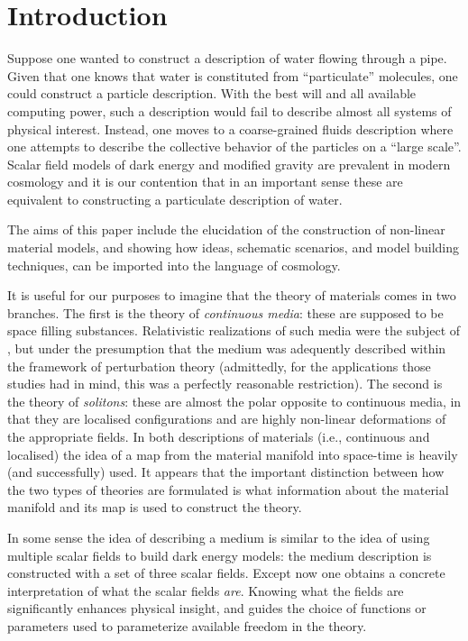 
\section{Introduction}

Suppose one wanted to construct a description of water flowing through a pipe. Given that one knows that water is constituted from ``particulate'' molecules,  one could construct a particle description. With the best will and all available computing power, such a description would fail to describe almost all systems of physical interest. Instead, one moves to a coarse-grained fluids description where one attempts to describe the collective behavior of the particles on a ``large scale''.  Scalar field models of dark energy and modified gravity are prevalent in modern cosmology and it is our contention that in an important sense these are equivalent to constructing a particulate description of water.

The aims of this paper include the elucidation of the construction of non-linear material models, and  showing how ideas, schematic scenarios, and model building techniques, can be imported into the language of cosmology.

It is useful for our purposes to imagine that the theory of materials comes in two branches. The first is the theory of   \textit{continuous media}: these are supposed to be space filling substances. Relativistic realizations of such media were the subject of \cite{Bucher:1998mh, Battye:2007aa, Pearson:2014iaa}, but under the presumption that the medium was adequently described within the framework of perturbation theory (admittedly,  for the applications those studies had in mind, this was a perfectly reasonable restriction).  The second is the theory of \textit{solitons}: these are almost the polar opposite to continuous media, in that they are localised configurations and are highly non-linear deformations of the appropriate fields. In both descriptions of materials (i.e., continuous and localised) the idea of a map from the material manifold into space-time is heavily (and successfully) used. It appears that the important distinction between how the two types of theories are formulated is what information about the material manifold and its map is used to construct the theory.

In some sense the idea of describing a medium is similar to the idea of using multiple scalar fields to build dark energy models: the medium description is constructed with a set of three scalar fields. Except now one obtains a concrete interpretation of what the scalar fields \textit{are}. Knowing what the fields are significantly enhances physical insight, and guides the choice of  functions or parameters used to parameterize available freedom in the theory.


